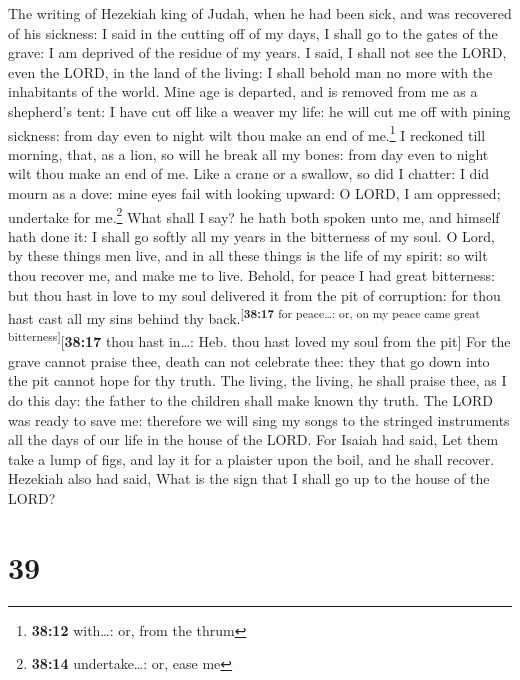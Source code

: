  The writing of Hezekiah king of Judah, when he had been
sick, and was recovered of his sickness:  I said in the
cutting off of my days, I shall go to the gates of the grave: I am
deprived of the residue of my years.  I said, I shall not
see the LORD, even the LORD, in the land of the living: I shall behold
man no more with the inhabitants of the world.  Mine age
is departed, and is removed from me as a shepherd's tent: I have cut off
like a weaver my life: he will cut me off with pining sickness: from day
even to night wilt thou make an end of me.\footnote{\textbf{38:12}
  with\ldots: or, from the thrum}  I reckoned till
morning, that, as a lion, so will he break all my bones: from day even
to night wilt thou make an end of me.  Like a crane or a
swallow, so did I chatter: I did mourn as a dove: mine eyes fail with
looking upward: O LORD, I am oppressed; undertake for me.\footnote{\textbf{38:14}
  undertake\ldots: or, ease me}  What shall I say? he
hath both spoken unto me, and himself hath done it: I shall go softly
all my years in the bitterness of my soul.  O Lord, by
these things men live, and in all these things is the life of my spirit:
so wilt thou recover me, and make me to live.  Behold,
for peace I had great bitterness: but thou hast in love to my soul
delivered it from the pit of corruption: for thou hast cast all my sins
behind thy back.\textsuperscript{{[}\textbf{38:17} for peace\ldots: or,
on my peace came great bitterness{]}}{[}\textbf{38:17} thou hast
in\ldots: Heb. thou hast loved my soul from the pit{]} 
For the grave cannot praise thee, death can not celebrate thee: they
that go down into the pit cannot hope for thy truth.  The
living, the living, he shall praise thee, as I do this day: the father
to the children shall make known thy truth.  The LORD was
ready to save me: therefore we will sing my songs to the stringed
instruments all the days of our life in the house of the LORD.
 For Isaiah had said, Let them take a lump of figs, and
lay it for a plaister upon the boil, and he shall recover.
 Hezekiah also had said, What is the sign that I shall go
up to the house of the LORD?

\hypertarget{section-38}{%
\section{39}\label{section-38}}

